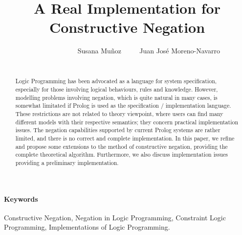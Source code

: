 \documentclass{llncs}
\begin{document}

\title{A Real Implementation for \\
       Constructive Negation}

\author{~~~~~~~~~~~~ Susana Mu\~{n}oz ~~~~ Juan Jos\'{e} Moreno-Navarro \\
 ~~~~~ }


\maketitle

\vspace{-12pt}

%



\begin{abstract}
  Logic Programming has been advocated as a language for system
  specification, especially for those involving logical behaviours,
  rules and knowledge. However, modelling problems involving negation,
  which is quite natural in many cases, is somewhat limitated if
  Prolog is used as the specification / implementation language. These
  restrictions are not related to theory viewpoint, where users can
  find many different models with their respective semantics; they
  concern practical implementation issues.  The negation capabilities
  supported by current Prolog systems are rather limited, and there is
  no correct and complete implementation.  In this paper, we refine
  and propose some extensions to the method of constructive negation,
  providing the complete theoretical algorithm. Furthermore, we also
  discuss implementation issues providing a preliminary
  implementation.
\end{abstract}

\paragraph{\bf Keywords}
Constructive Negation, Negation in Logic Programming, Constraint Logic
Programming, Implementations of Logic Programming.
\end{document}
